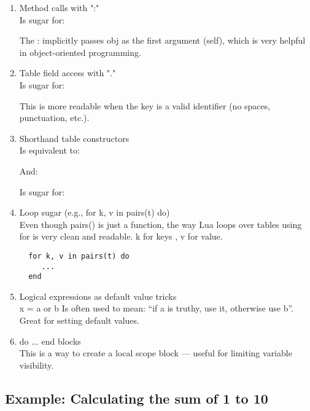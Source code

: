    \begin{enumerate}
  \item  Method calls with ":"\\
  Is sugar for: 

 The : implicitly passes obj as the first argument (self), which is very helpful in object-oriented programming.


  \item   Table field access with "."\\
    Is sugar for: 

  This is more readable when the key is a valid identifier (no spaces, punctuation, etc.).

  \item Shorthand table constructors\\
    Is equivalent to: 

  And:

   Is sugar for:  

  \item Loop sugar (e.g., for k, v in pairs(t) do)\\
  Even though pairs() is just a function, the way Lua loops over tables using for is very clean and readable. k for keys , v for value.

\begin{mybox}
\begin{verbatim}
  for k, v in pairs(t) do
     ...
  end
\end{verbatim}
\end{mybox}


 \item  Logical expressions as default value tricks\\
 x = a or b
 Is often used to mean: “if a is truthy, use it, otherwise use b”. Great for setting default values.

 \item  do ... end blocks\\
 This is a way to create a local scope block — useful for limiting variable visibility.
\end{enumerate}

\subsection{Example: Calculating the sum of 1 to 10}
\label{sub:calculating_the_sum}

